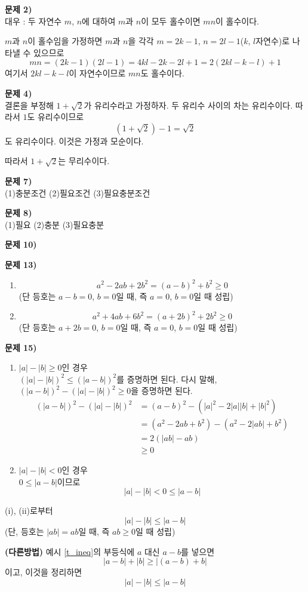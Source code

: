 \documentclass{oblivoir}
\newcounter{num}
\newcommand\an[1]{\par\bigskip\noindent\textbf{문제 #1)}\\}
\begin{document}
%
\an{2}
대우 : 두 자연수 \(m\), \(n\)에 대하여 \(m\)과 \(n\)이 모두 홀수이면 \(mn\)이 홀수이다.
\par\medskip\noindent
\(m\)과 \(n\)이 홀수임을 가정하면 \(m\)과 \(n\)을 각각 \(m=2k-1\), \(n=2l-1\)(\(k\), \(l\)\은 자연수)로 나타낼 수 있으므로
\[mn=(2k-1)(2l-1)=4kl-2k-2l+1=2(2kl-k-l)+1\]
여기서 \(2kl-k-l\)이 자연수이므로 \(mn\)도 홀수이다.

%
\an{4}
결론을 부정해 \(1+\sqrt2\)가 유리수라고 가정하자.
두 유리수 사이의 차는 유리수이다.
따라서 \(1\)도 유리수이므로
\[(1+\sqrt2)-1=\sqrt2\]
도 유리수이다.
이것은 가정과 모순이다.

따라서 \(1+\sqrt2\)는 무리수이다.

%
\an{7}
(1)\:\:충분조건
(2)\:\:필요조건
(3)\:\:필요충분조건

%
\an{8}
(1)\:\:필요
(2)\:\:충분
(3)\:\:필요충분

%
\an{10}

%
\an{13}
\begin{enumerate}
\item
\[a^2-2ab+2b^2=(a-b)^2+b^2\ge0\]
(단 등호는 \(a-b=0\), \(b=0\)일 때, 즉 \(a=0\), \(b=0\)일 때 성립)
\item
\[a^2+4ab+6b^2=(a+2b)^2+2b^2\ge0\]
(단 등호는 \(a+2b=0\), \(b=0\)일 때, 즉 \(a=0\), \(b=0\)일 때 성립)
\end{enumerate}

%
\an{15}
\begin{enumerate}[label=(\roman*)]
\item
\(|a|-|b|\ge0\)인 경우\\
\(\left(|a|-|b|\right)^2\le\left(|a-b|\right)^2\)를 증명하면 된다.
다시 말해, \(\left(|a-b|\right)^2-\left(|a|-|b|\right)^2\ge0\)을 증명하면 된다.
\begin{align*}
\left(|a-b|\right)^2-\left(|a|-|b|\right)^2
&=(a-b)^2-\left(|a|^2-2|a||b|+|b|^2\right)\\
&=(a^2-2ab+b^2)-(a^2-2|ab|+b^2)\\
&=2\left(|ab|-ab\right)\\
&\ge0
\end{align*}
\item
\(|a|-|b|<0\)인 경우\\
\(0\le|a-b|\)이므로
\[|a|-|b|<0\le|a-b|\]
\end{enumerate}
(i), (ii)로부터
\[|a|-|b|\le|a-b|\]
(단, 등호는 \(|ab|=ab\)일 때, 즉 \(ab\ge0\)일 때 성립)

\vspace{40pt}
\textbf{(다른방법)}
예시 \ref{t_ineq}의 부등식에 \(a\) 대신 \(a-b\)를 넣으면
\[|a-b|+|b|\ge|(a-b)+b|\]
이고, 이것을 정리하면
\[|a|-|b|\le|a-b|\]
\end{document}
